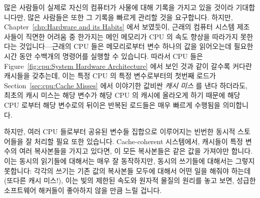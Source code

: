 많은 사람들이 실제로 자신의 컴퓨터가 사물에 대해 기록을 가지고 있을 것이라
기대합니다만, 많은 사람들은 또한 그 기록을 빠르게 관리할 것을 요구합니다.
하지만, Chapter~\ref{chp:Hardware and its Habits} 에서 보였듯이, 근래의 컴퓨터
시스템 제조사들이 직면한 어려움 중 한가지는 메인 메모리가 CPU 의 속도 향상을
따라가지 못한다는 것입니다---근래의 CPU 들은 메모리로부터 변수 하나의 값을
읽어오는데 필요한 시간 동안 수백개의 명령어를 실행할 수 있습니다.
따라서 CPU 들은
Figure~\ref{fig:cpu:System Hardware Architecture} 에서 보인 것과 같이
갈수록 커다란 캐시들을 갖추는데, 이는 특정 CPU 의 특정 변수로부터의 첫번째
로드가
Section~\ref{sec:cpu:Cache Misses} 에서 이야기한 값비싼 \emph{캐시 미스} 를
낸다 하더라도, 최초의 캐시 미스는 해당 변수가 해당 CPU 의 캐시에 올라오게 하기
때문에 해당 CPU 로부터 해당 변수로의 뒤이은 반복된 로드들은 매우 빠르게
수행됨을 의미합니다.

하지만, 여러 CPU 들로부터 공유된 변수들 집합으로 이루어지는 빈번한 동시적
스토어들을 잘 처리할 필요 또한 있습니다.
Cache-coherent 시스템에서, 캐시들이 특정 변수의 여러 복사본들을 가지고 있다면,
이 모든 복사본들은 같은 값을 가져야만 합니다.
이는 동시의 읽기들에 대해서는 매우 잘 동작하지만, 동시의 쓰기들에 대해서는
그렇지 못합니다:  각각의 쓰기는 기존 값의 복사본들 모두에 대해서 어떤 일을
해줘야 하는데 (또다른 캐시 미스!), 이는 빛의 제한된 속도와 원자적 물질의 원리를
놓고 보면, 성급한 소프트웨어 해커들이 좋아하지 않을 만큼 느릴 겁니다.

